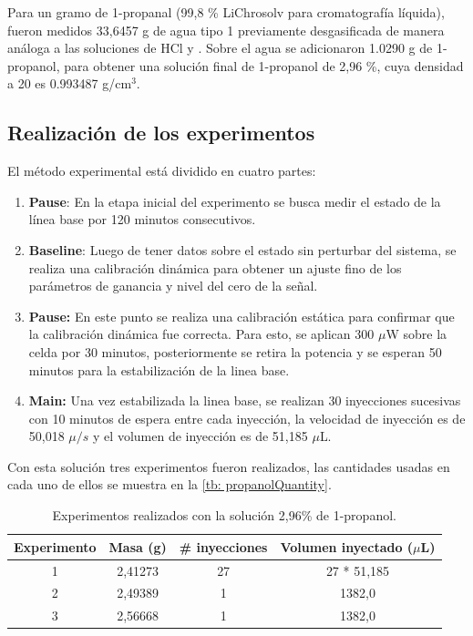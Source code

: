 	Para un gramo de 1-propanal (99,8 \% LiChrosolv para cromatograf\'ia l\'iquida), fueron medidos 33,6457 g de agua tipo 1 previamente desgasificada de manera an\'aloga a las soluciones de HCl y . Sobre el agua se adicionaron 1.0290 g de 1-propanol, para obtener una soluci\'on final de 1-propanol de 2,96 \%, cuya densidad a 20 \grad{} es 0.993487 g/cm$^3$.
	
	\subsection{Realizaci\'on de los experimentos}\label{sec: method}
	El m\'etodo experimental est\'a dividido en cuatro partes:
	\begin{enumerate}
		\item \textbf{Pause}: En la etapa inicial del experimento se busca medir el estado de la línea base por 120 minutos consecutivos.
		\item \textbf{Baseline}: Luego de tener datos sobre el estado sin perturbar del sistema, se realiza una calibración dinámica para obtener un ajuste fino de los parámetros de ganancia y nivel del cero de la señal. 
		\item \textbf{Pause:} En este punto se realiza una calibraci\'on est\'atica para confirmar que la calibraci\'on din\'amica fue correcta. Para esto, se aplican 300 $\mu$W sobre la celda por 30 minutos, posteriormente se retira la potencia y se esperan 50 minutos para la estabilizaci\'on de la linea base.
		\item \textbf{Main:} Una vez estabilizada la linea base, se realizan 30 inyecciones sucesivas con 10 minutos de espera entre cada inyecci\'on, la velocidad de inyecci\'on es de 50,018 $\mu/s$ y el volumen de inyecci\'on es de 51,185 $\mu$L.
	\end{enumerate}
	
	Con esta soluci\'on tres experimentos fueron realizados, las cantidades usadas en cada uno de ellos se muestra en la \autoref{tb: propanolQuantity}.
	
	\begin{table}[h]
		\centering
		\caption{Experimentos realizados con la soluci\'on 2,96\% de 1-propanol.}
		\begin{tabular}{cccc}
			\hline
			\textbf{Experimento} & \textbf{Masa \ce{H2O} (g)} & \textbf{\# inyecciones} & \textbf{Volumen inyectado ($\mu$L)}\\
			\hline
			1 & 2,41273 & 27 & 27 * 51,185 \\
			2 & 2,49389 & 1 & 1382,0 \\
			3 & 2,56668 & 1 & 1382,0 \\
			\hline
		\end{tabular}
		\label{tb: propanolQuantity}
	\end{table}
	
